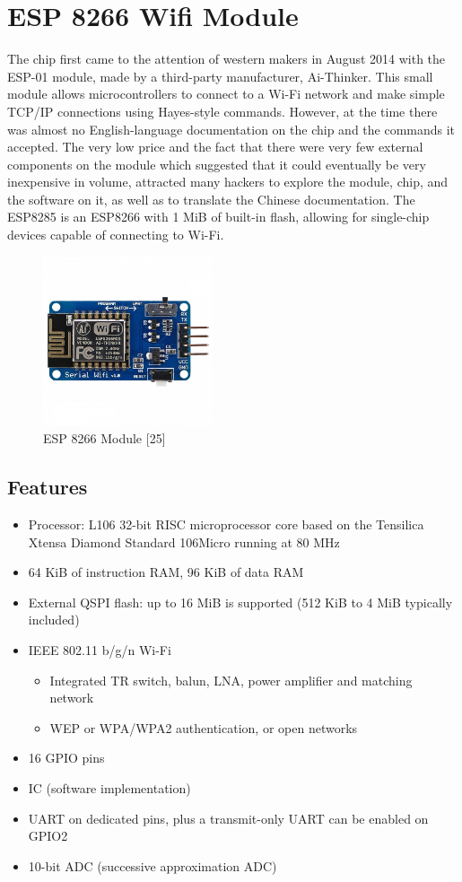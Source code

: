 \documentclass[twoside,a4paper,16pt]{book}
\begin{document}
{{			\section{ESP 8266 Wifi Module }
			The chip first came to the attention of western makers in August 2014 with the ESP-01 module, made by a third-party manufacturer, Ai-Thinker. This small module allows microcontrollers to connect to a Wi-Fi network and make simple TCP/IP connections using Hayes-style commands. However, at the time there was almost no English-language documentation on the chip and the commands it accepted. The very low price and the fact that there were very few external components on the module which suggested that it could eventually be very inexpensive in volume, attracted many hackers to explore the module, chip, and the software on it, as well as to translate the Chinese documentation.
			The ESP8285 is an ESP8266 with 1 MiB of built-in flash, allowing for single-chip devices capable of connecting to Wi-Fi.
			\begin{figure}[ht!]
				\begin{center}
					\includegraphics[width=5.0cm]{16.jpg}
					\caption{ESP 8266 Module [25]}
				\end{center}
			\end{figure}
			\subsection*{Features}
			\begin{itemize}
				\item Processor: L106 32-bit RISC microprocessor core based on the Tensilica Xtensa Diamond Standard 106Micro running at 80 MHz
				\item 64 KiB of instruction RAM, 96 KiB of data RAM
				\item External QSPI flash: up to 16 MiB is supported (512 KiB to 4 MiB typically included)
				\item IEEE 802.11 b/g/n Wi-Fi
				\begin{itemize}
					\item Integrated TR switch, balun, LNA, power amplifier and matching network
					\item WEP or WPA/WPA2 authentication, or open networks
				\end{itemize}
				\item 16 GPIO pins
				\item IC (software implementation)
				\item UART on dedicated pins, plus a transmit-only UART can be enabled on GPIO2
				\item 10-bit ADC (successive approximation ADC)
				

\end{itemize}}}
\end{document}
